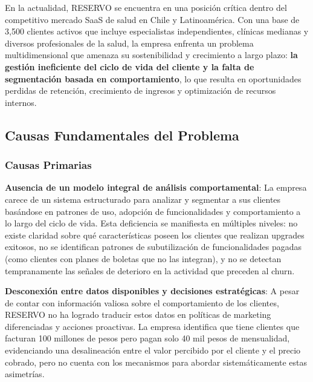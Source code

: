 
En la actualidad, RESERVO se encuentra en una posición crítica dentro del competitivo mercado SaaS de salud en Chile y Latinoamérica. Con una base de 3{,}500 clientes activos que incluye especialistas independientes, clínicas medianas y diversos profesionales de la salud, la empresa enfrenta un problema multidimensional que amenaza su sostenibilidad y crecimiento a largo plazo: \textbf{la gestión ineficiente del ciclo de vida del cliente y la falta de segmentación basada en comportamiento}, lo que resulta en oportunidades perdidas de retención, crecimiento de ingresos y optimización de recursos internos.

\subsection{Causas Fundamentales del Problema}

\subsubsection{Causas Primarias}

\textbf{Ausencia de un modelo integral de análisis comportamental}: La empresa carece de un sistema estructurado para analizar y segmentar a sus clientes basándose en patrones de uso, adopción de funcionalidades y comportamiento a lo largo del ciclo de vida. Esta deficiencia se manifiesta en múltiples niveles: no existe claridad sobre qué características poseen los clientes que realizan upgrades exitosos, no se identifican patrones de subutilización de funcionalidades pagadas (como clientes con planes de boletas que no las integran), y no se detectan tempranamente las señales de deterioro en la actividad que preceden al churn.

\textbf{Desconexión entre datos disponibles y decisiones estratégicas}: A pesar de contar con información valiosa sobre el comportamiento de los clientes, RESERVO no ha logrado traducir estos datos en políticas de marketing diferenciadas y acciones proactivas. La empresa identifica que tiene clientes que facturan 100 millones de pesos pero pagan solo 40 mil pesos de mensualidad, evidenciando una desalineación entre el valor percibido por el cliente y el precio cobrado, pero no cuenta con los mecanismos para abordar sistemáticamente estas asimetrías.

